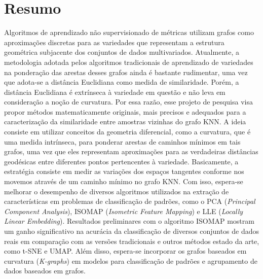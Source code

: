 \documentclass[a4paper, 12pt]{article}
\begin{document}


\newpage 

\section*{Resumo}
\noindent
Algoritmos de aprendizado não supervisionado de métricas utilizam grafos como aproximações discretas para as variedades que representam a estrutura geométrica subjacente dos conjuntos de dados multivariados. Atualmente, a metodologia adotada pelos algoritmos tradicionais de aprendizado de variedades na ponderação das arestas desses grafos ainda é bastante rudimentar, uma vez que adota-se a distância Euclidiana como medida de similaridade. Porém, a distância Euclidiana é extrínseca à variedade em questão e não leva em consideração a noção de curvatura. Por essa razão, esse projeto de pesquisa visa propor métodos matematicamente originais, mais precisos e adequados para a caracterização da similaridade entre amostras vizinhas do grafo KNN. A ideia consiste em utilizar conceitos da geometria diferencial, como a curvatura, que é uma medida intrínseca, para ponderar arestas de caminhos mínimos em tais grafos, uma vez que eles representam aproximações para as verdadeiras distâncias geodésicas entre diferentes pontos pertencentes à variedade. Basicamente, a estratégia consiste em medir as variações dos espaços tangentes conforme nos movemos através de um caminho mínimo no grafo KNN. Com isso, espera-se melhorar o desempenho de diversos algoritmos utilizados na extração de características em problemas de classificação de padrões, como o PCA (\emph{Principal Component Analysis}), ISOMAP (\emph{Isometric Feature Mapping}) e LLE (\emph{Locally Linear Embedding}). Resultados preliminares com o algoritmo ISOMAP mostram um ganho significativo na acurácia da classificação de diversos conjuntos de dados reais em comparação com as versões tradicionais e outros métodos estado da arte, como t-SNE e UMAP. Além disso, espera-se incorporar os grafos baseados em curvatura (\emph{K-graphs}) em modelos para classificação de padrões e agrupamento de dados baseados em grafos.  
\end{document}

